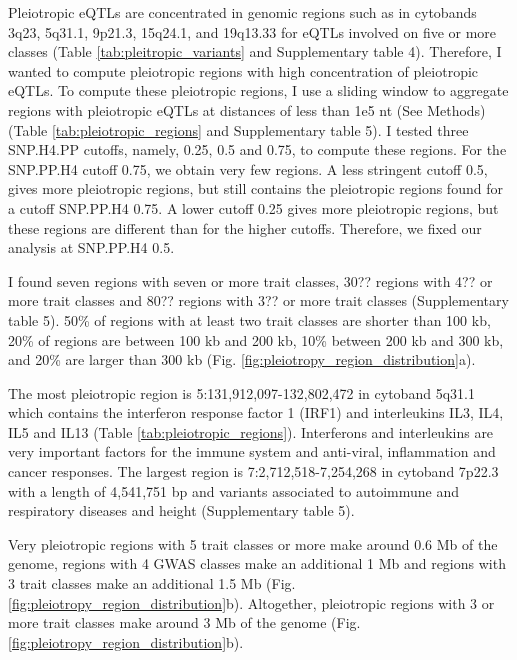 Pleiotropic eQTLs are concentrated in genomic regions such as in cytobands 3q23,
5q31.1, 9p21.3, 15q24.1, and 19q13.33 for eQTLs involved on five or more classes (Table \ref{tab:pleitropic_variants} and Supplementary table 4).
%
Therefore, I wanted to compute pleiotropic regions with high concentration of pleiotropic eQTLs.
%
To compute these pleiotropic regions, I use a sliding window to aggregate regions with pleiotropic eQTLs at distances
of less than 1e5 nt (See Methods) (Table \ref{tab:pleiotropic_regions} and Supplementary table 5).
%
I tested three SNP.H4.PP cutoffs, namely, 0.25, 0.5 and 0.75, to compute these regions.
%
For the SNP.PP.H4 cutoff 0.75, we obtain very few regions.
%
A less stringent cutoff 0.5, gives more pleiotropic regions, but still contains the pleiotropic regions found for a
cutoff SNP.PP.H4 0.75.
%
A lower cutoff 0.25 gives more pleiotropic regions, but these regions are different than for the higher cutoffs.
%
Therefore, we fixed our analysis at SNP.PP.H4 0.5.

%
I found seven regions with seven or more trait classes, 30?? regions with 4?? or more trait
classes and 80?? regions with 3?? or more trait classes (Supplementary table 5).
%
50\% of regions with at least two trait classes are shorter than 100 kb, 20\% of regions are
between 100 kb and 200 kb, 10\% between 200 kb and 300 kb, and 20\% are larger than 300 kb (Fig. \ref{fig:pleiotropy_region_distribution}a).

The most pleiotropic region is 5:131,912,097-132,802,472 in cytoband 5q31.1 which contains the interferon response factor 1
(IRF1) and interleukins IL3, IL4, IL5 and IL13 (Table \ref{tab:pleiotropic_regions}).
%
Interferons and interleukins are very important factors for the immune system and anti-viral, inflammation and cancer responses.
%
The largest region is 7:2,712,518-7,254,268 in cytoband 7p22.3 with a length of 4,541,751 bp and variants associated to
autoimmune and respiratory diseases and height (Supplementary table 5).

Very pleiotropic regions with 5 trait classes or more make around 0.6 Mb of the genome,
regions with 4 GWAS classes make an additional 1 Mb and regions with 3 trait classes make an additional 1.5 Mb (Fig. \ref{fig:pleiotropy_region_distribution}b).
%
Altogether, pleiotropic regions with 3 or more trait classes make around 3 Mb of the genome (Fig. \ref{fig:pleiotropy_region_distribution}b).

%
